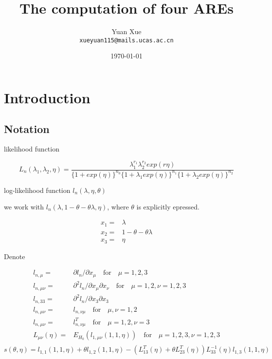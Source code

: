\documentclass{article}
\title{The computation of four AREs} %
\author{Yuan Xue\\ \texttt{xueyuan115@mails.ucas.ac.cn}} %
\date{\today} %
\begin{document}
\maketitle %


\section{Introduction} %


\subsection{Notation}
likelihood function

\begin{equation}
 L_n(\lambda_1,\lambda_2,\eta) = \frac{\lambda_1^{r_1}\lambda_2^{r_2}exp(r\eta)}{\{1+exp(\eta)\}^{n_0}\{1+\lambda_1exp(\eta)\}^{n_1}\{1+\lambda_2exp(\eta)\}^{n_2}}
\end{equation}

log-likelihood function $l_n(\lambda,\eta,\theta)$

we work with $l_n(\lambda,1-\theta-\theta\lambda,\eta)$, where $\theta$  is explicitly epressed.

\begin{align*}
x_1 = & \lambda\\
x_2= & 1-\theta-\theta\lambda\\
x_3 = & \eta
\end{align*}

Denote

\begin{align*}
  l_{n,\mu} =& \partial l_n/\partial x_\mu \quad \text{for} \quad \mu= 1,2,3 \\
  l_{n,\mu\nu}= & \partial^2 l_n/\partial x_\mu \partial x_\nu \quad \text{for} \quad \mu=1,2, \nu= 1,2,3\\
  l_{n,33}= & \partial^2 l_n/\partial x_3 \partial x_3\\
  l_{n,\mu\nu} = & l_{n,\nu\mu} \quad \text{for} \quad \mu,\nu = 1,2\\
  l_{n,\mu\nu} = & l^T_{n,\nu\mu} \quad \text{for} \quad \mu= 1,2, \nu=3\\
  L_{\mu\nu}(\eta) =& E_{H_0}(l_{1,\mu\nu}(1,1,\eta))\quad \text{for} \quad \mu=1,2,3, \nu= 1,2,3\\
\end{align*}
$$s(\theta,\eta) = l_{1,1}(1,1,\eta)+\theta l_{1,2}(1,1,\eta)-(L_{13}^T(\eta)+\theta L_{23}^T(\eta))L_{33}^{-1}(\eta)l_{1,3}(1,1,\eta)$$\\
\end{document}
